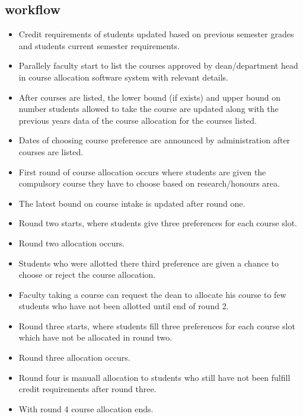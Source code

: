 \documentclass[conference]{IEEEtran}
\begin{document}
\subsection{workflow}
\begin{itemize}
\item   
Credit requirements of students updated based on previous semester grades and students current semester requirements.
\item
Parallely faculty start to list the courses approved by dean/department head in course allocation software system with relevant details.\\
\item
After courses are listed, the lower bound (if exists) and upper bound on number students allowed to take the course are updated 
along with the previous years data of the course allocation for the courses listed.
\item Dates of choosing course preference are announced by administration after courses are listed.
\item First round of course allocation occurs where students are given the compulsory course they have to choose based on research/honours area.
\item The latest bound on course intake is updated after round one.
\item Round two starts, where students give three preferences for each course slot.
\item Round two allocation occurs. 
\item Students who were allotted there third preference are given a chance to choose or reject the course allocation.
\item Faculty taking a course can request the dean to allocate his course to few students who have not been allotted until end of round 2.
\item Round three starts, where students fill three preferences for each course slot which have not be allocated in round two.
\item Round three allocation occurs. 
\item Round four is manuall allocation to students who still have not been fulfill credit requirements after round three. 
\item With round 4 course allocation ends.
\end{itemize}
\end{document}
